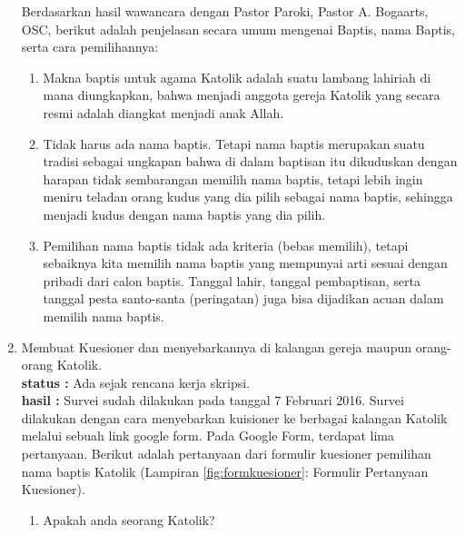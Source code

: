 \documentclass[a4paper,twoside]{article}
\begin{document}
\begin{enumerate}
		Berdasarkan hasil wawancara dengan Pastor Paroki, Pastor A. Bogaarts, OSC, berikut adalah penjelasan secara umum mengenai Baptis, nama Baptis, serta cara pemilihannya:
\begin{enumerate}
	\item Makna baptis untuk agama Katolik adalah suatu lambang lahiriah di mana diungkapkan, bahwa menjadi anggota gereja Katolik yang secara resmi adalah diangkat menjadi anak Allah.
	\item Tidak harus ada nama baptis. Tetapi nama baptis merupakan suatu tradisi sebagai ungkapan bahwa di dalam baptisan itu dikuduskan dengan harapan tidak sembarangan memilih nama baptis, tetapi lebih ingin meniru teladan orang kudus yang dia pilih sebagai nama baptis, sehingga menjadi kudus dengan nama baptis yang dia pilih.
		\item Pemilihan nama baptis tidak ada kriteria (bebas memilih), tetapi sebaiknya kita memilih nama baptis yang mempunyai arti sesuai dengan pribadi dari calon baptis. Tanggal lahir, tanggal pembaptisan, serta tanggal pesta santo-santa (peringatan) juga bisa dijadikan acuan dalam memilih nama baptis.
\end{enumerate}
		
		\item Membuat Kuesioner dan menyebarkannya di kalangan gereja maupun orang-orang Katolik.\\
		{\bf status :} Ada sejak rencana kerja skripsi.\\
		{\bf hasil :} Survei sudah dilakukan pada tanggal 7 Februari 2016. Survei dilakukan dengan cara menyebarkan kuisioner ke berbagai kalangan Katolik melalui sebuah link google form. Pada Google Form, terdapat lima pertanyaan. Berikut adalah pertanyaan dari formulir kuesioner pemilihan nama baptis Katolik (Lampiran \ref{fig:formkuesioner}: Formulir Pertanyaan Kuesioner).

\begin{enumerate}
	\item Apakah anda seorang Katolik?
	

\end{enumerate}
\end{enumerate}
\end{document}
